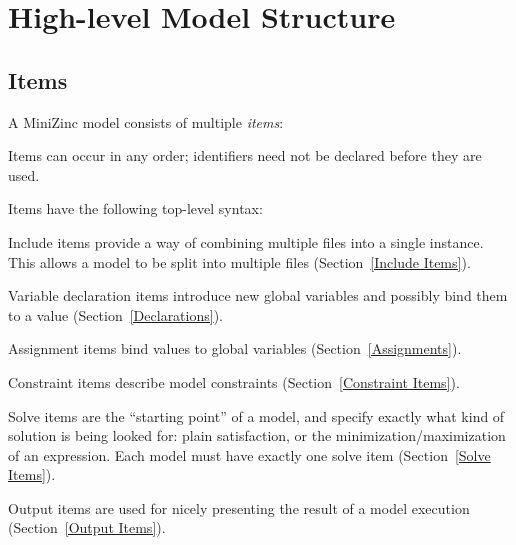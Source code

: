 \documentclass[10pt]{scrartcl}
\begin{document}
\section{High-level Model Structure}
  \label{High-level Model Structure}
\subsection{Items}
A MiniZinc model consists of multiple \emph{items}:
\begin{productions}
    \RuleModel
\end{productions}

Items can occur in any order;  identifiers need not be declared before they
are used.

Items have the following top-level syntax:
\begin{productions}
    \RuleItem
\end{productions}


Include items provide a way of combining multiple files into a single
instance.  This allows a model to be split into multiple files
(Section~\ref{Include Items}).

Variable declaration items introduce new global variables and possibly
bind them to a value (Section~\ref{Declarations}).

Assignment items bind values to global variables
(Section~\ref{Assignments}).

Constraint items describe model constraints (Section~\ref{Constraint
Items}).

Solve items are the ``starting point'' of a model, and specify exactly
what kind of solution is being looked for:  plain satisfaction, or the
minimization/maximization of an expression.  Each model must have exactly
one solve item (Section~\ref{Solve Items}).

Output items are used for nicely presenting the result of a model
execution (Section~\ref{Output Items}).
\end{document}
